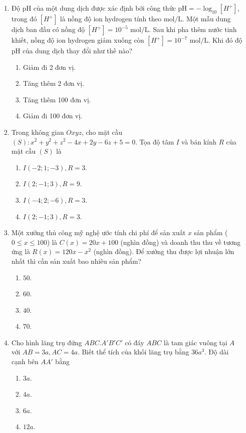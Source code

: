\documentclass[12pt,a4paper]{article}
\begin{document}
\begin{enumerate}[label=\textbf{Câu \arabic*:}, leftmargin=*]
\item Độ pH của một dung dịch được xác định bởi công thức $\text{pH} = -\log_{10}[H^+]$, trong đó $[H^+]$ là nồng độ ion hydrogen tính theo $\text{mol/L}$. Một mẫu dung dịch ban đầu có nồng độ $[H^+] = 10^{-5}\text{ mol/L}$. Sau khi pha thêm nước tinh khiết, nồng độ ion hydrogen giảm xuống còn $[H^+] = 10^{-7}\text{ mol/L}$. Khi đó độ pH của dung dịch thay đổi như thế nào?
\begin{enumerate}[label=\Alph*.]
    \item Giảm đi 2 đơn vị.
    \item Tăng thêm 2 đơn vị.
    \item Tăng thêm 100 đơn vị.
    \item Giảm đi 100 đơn vị.
\end{enumerate}

\item Trong không gian $Oxyz$, cho mặt cầu $(S): x^2 + y^2 + z^2 - 4x + 2y - 6z + 5 = 0$. Tọa độ tâm $I$ và bán kính $R$ của mặt cầu $(S)$ là
\begin{enumerate}[label=\Alph*.]
    \item $I(-2; 1; -3), R = 3$.
    \item $I(2; -1; 3), R = 9$.
    \item $I(-4; 2; -6), R = 3$.
    \item $I(2; -1; 3), R = 3$.
\end{enumerate}

\item Một xưởng thủ công mỹ nghệ ước tính chi phí để sản xuất $x$ sản phẩm ($0 \le x \le 100$) là $C(x) = 20x + 100$ (nghìn đồng) và doanh thu thu về tương ứng là $R(x) = 120x - x^2$ (nghìn đồng). Để xưởng thu được lợi nhuận lớn nhất thì cần sản xuất bao nhiêu sản phẩm?
\begin{enumerate}[label=\Alph*.]
    \item $50$.
    \item $60$.
    \item $40$.
    \item $70$.
\end{enumerate}

\item Cho hình lăng trụ đứng $ABC.A'B'C'$ có đáy $ABC$ là tam giác vuông tại $A$ với $AB = 3a, AC = 4a$. Biết thể tích của khối lăng trụ bằng $36a^3$. Độ dài cạnh bên $AA'$ bằng
\begin{enumerate}[label=\Alph*.]
    \item $3a$.
    \item $4a$.
    \item $6a$.
    \item $12a$.
\end{enumerate}

\end{enumerate}
\end{document}
